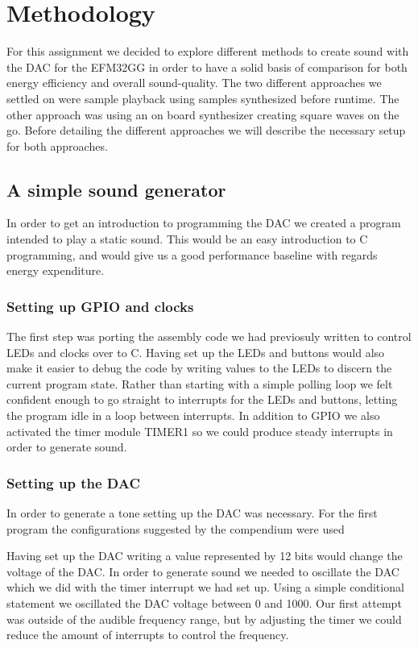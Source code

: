 \chapter{Methodology}

For this assignment we decided to explore different methods to create sound with the DAC for the EFM32GG in order to have a solid basis of comparison for both energy efficiency and overall sound-quality. The two different approaches we settled on were sample playback using samples synthesized before runtime. The other approach was using an on board synthesizer creating square waves on the go. Before detailing the different approaches we will describe the necessary setup for both approaches.

\section{A simple sound generator}
In order to get an introduction to programming the DAC we created a program intended to play a static sound. This would be an easy introduction to C programming, and would give us a good performance baseline with regards energy expenditure.

\subsection{Setting up GPIO and clocks} 
The first step was porting the assembly code we had previosuly written to control LEDs and clocks over to C. Having set up the LEDs and buttons would also make it easier to debug the code by writing values to the LEDs to discern the current program state. Rather than starting with a simple polling loop we felt confident enough to go straight to interrupts for the LEDs and buttons, letting the program idle in a loop between interrupts. In addition to GPIO we also activated the timer module TIMER1 so we could produce steady interrupts in order to generate sound.


\subsection{Setting up the DAC}
In order to generate a tone setting up the DAC was necessary. For the first program the configurations suggested by the compendium were used


Having set up the DAC writing a value represented by 12 bits would change the voltage of the DAC. In order to generate sound we needed to oscillate the DAC which we did with the timer interrupt we had set up. Using a simple conditional statement we oscillated the DAC voltage between 0 and 1000. Our first attempt was outside of the audible frequency range, but by adjusting the timer we could reduce the amount of interrupts to control the frequency.

